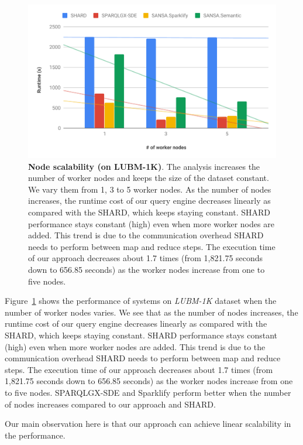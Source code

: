 \begin{figure}
  \includegraphics[width=1.0\columnwidth]{images/6_scalable_rdf_querying/semantic-based-node-scalability.pdf}
    \caption{\textbf{Node scalability (on LUBM-1K)}.
    The analysis increases the number of worker nodes and keeps the size of the dataset constant. 
    We vary them from 1, 3 to 5 worker nodes.
    As the number of nodes increases, the runtime cost of our query engine decreases linearly as compared with the SHARD, which keeps staying constant. 
    SHARD performance stays constant (high) even when more worker nodes are added. This trend is due to the communication overhead SHARD needs to perform between map and reduce steps. The execution time of our approach decreases about 1.7 times (from 1,821.75 seconds down to 656.85 seconds) as the worker nodes increase from one to five nodes.}
    \label{fig:semantic-based-node-scalability}
\end{figure}

Figure~\ref{fig:semantic-based-node-scalability} shows the performance of systems on \textit{LUBM-1K} dataset when the number of worker nodes varies.
We see that as the number of nodes increases, the runtime cost of our query engine decreases linearly as compared with the SHARD, which keeps staying constant.
SHARD performance stays constant (high) even when more worker nodes are added.
This trend is due to the communication overhead SHARD needs to perform between map and reduce steps.
The execution time of our approach decreases about 1.7 times (from 1,821.75 seconds down to 656.85 seconds) as the worker nodes increase from one to five nodes.
SPARQLGX-SDE and Sparklify perform better when the number of nodes increases compared to our approach and SHARD. 

Our main observation here is that our approach can achieve linear scalability in the performance.

